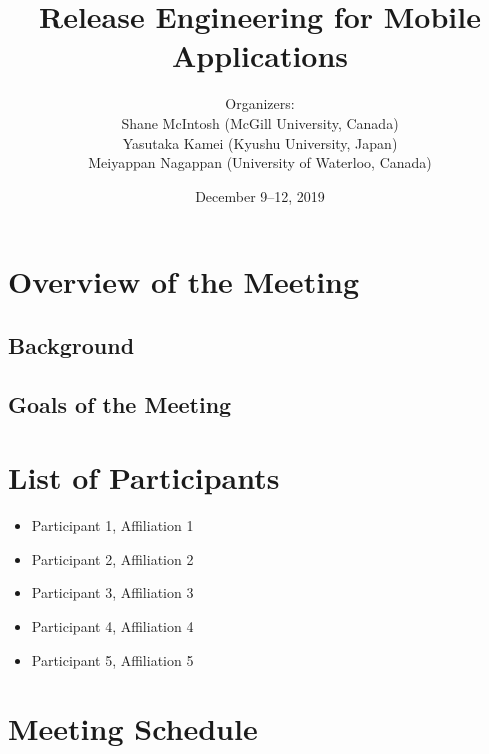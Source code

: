 \documentclass[a4paper]{article}
\begin{document}
\SHONANmakecover

\title{Release Engineering for Mobile Applications}
\author{Organizers:\\
Shane McIntosh (McGill University, Canada)\\
Yasutaka Kamei (Kyushu University, Japan)\\
Meiyappan Nagappan (University of Waterloo, Canada)}
\date{December 9--12, 2019}
\maketitle

\section{Overview of the Meeting}

\subsection{Background}

\subsection{Goals of the Meeting}

\clearpage

\section{List of Participants}
\begin{itemize}
\item Participant 1, Affiliation 1
\item Participant 2, Affiliation 2
\item Participant 3, Affiliation 3
\item Participant 4, Affiliation 4
\item Participant 5, Affiliation 5
\end{itemize}

\clearpage

\section{Meeting Schedule}
\end{document}
